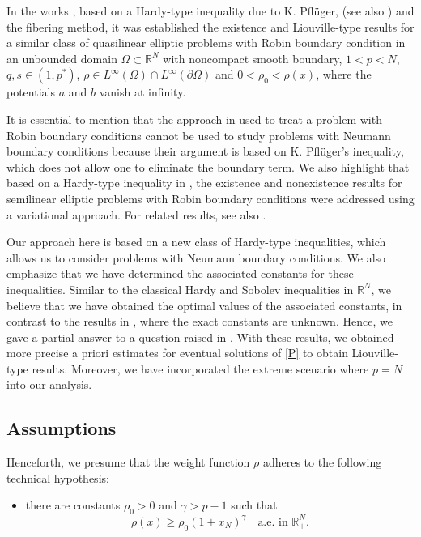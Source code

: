 \documentclass[12pt,reqno]{amsart}
\begin{document}
In the works \cite{zbMATH05077864,zbMATH05640324}, based on a Hardy-type inequality due to K. Pfl\"{u}ger, \cite{zbMATH01148489} (see also \cite{zbMATH04019575}) and the fibering method,  it was established the existence and Liouville-type results for a similar class of quasilinear elliptic problems with Robin boundary condition in an unbounded domain $\Omega\subset \mathds{R}^N$ with noncompact smooth boundary, $1<p<N$, $q,s \in (1,p^*)$, $\rho \in L^\infty(\Omega)\cap L^\infty(\partial \Omega) $ and $0<\rho_0<\rho(x) $,  where the potentials $a$ and $b$ vanish at infinity. 

It is essential to mention that the approach in \cite{zbMATH05640324} used to treat a problem with Robin boundary conditions cannot be used to study problems with Neumann boundary conditions because their argument is based on K. Pfl\"{u}ger's inequality, which does not allow one to eliminate the boundary term. We also highlight that based on a Hardy-type inequality in \cite{EMEDOOEVE2010}, the existence and nonexistence results for semilinear elliptic problems with Robin boundary conditions were addressed using a variational approach. For related results, see also \cite{zbMATH05308896}.









 
Our approach here is based on a new class of Hardy-type inequalities, which allows us to consider problems with Neumann boundary conditions. We also emphasize that we have determined the associated constants for these inequalities. Similar to the classical Hardy and Sobolev inequalities in $\mathds{R}^N$, we believe that we have obtained the optimal values of the associated constants, in contrast to the results in \cite{zbMATH05640324}, where the exact constants are unknown. Hence, we gave a partial answer to a question raised in \cite{zbMATH05640324}. 
With these results, we obtained more precise a priori estimates for eventual solutions of \eqref{P} to obtain Liouville-type results.  
Moreover, we have incorporated the extreme scenario where $p=N$ into our analysis.
 



\subsection{Assumptions} 
Henceforth, we presume that the weight function $\rho$ adheres to the following technical hypothesis:
	\begin{itemize}
		\item [$(H_0)$] there are constants $\rho_0>0$ and  $\gamma>p-1$ such that
		$$
		\rho(x)\geq \rho_0(1+x_N)^\gamma\quad \text{a.e. in $\mathds{R}^N_+$}.
		$$
		\end{itemize}
\end{document}
